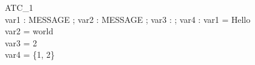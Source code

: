 \begin{schema}{ATC\_1}\\
 var1 : MESSAGE ;
 var2 : MESSAGE ;
 var3 : \nat ;
 var4 : \power \nat
\where
 var1 = Hello \\
 var2 = world \\
 var3 = 2 \\
 var4 = \{1, 2\}
\end{schema}